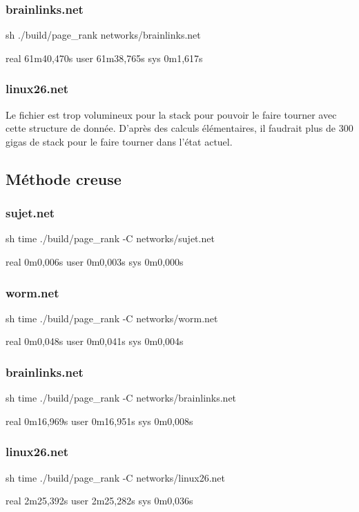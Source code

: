 \documentclass{NewTeX}
\begin{document}
\subsubsection{brainlinks.net}
\begin{code}{sh}
./build/page_rank networks/brainlinks.net

real    61m40,470s
user    61m38,765s
sys     0m1,617s
\end{code}

\subsubsection{linux26.net}
Le fichier est trop volumineux pour la stack pour pouvoir le faire tourner avec cette structure de donnée. D'après des calculs élémentaires, il faudrait plus de 300 gigas de stack pour le faire tourner dans l'état actuel.

\subsection{Méthode creuse}
\subsubsection{sujet.net}
\begin{code}{sh}
time ./build/page_rank -C networks/sujet.net

real    0m0,006s
user    0m0,003s
sys     0m0,000s
\end{code}
\subsubsection{worm.net}
\begin{code}{sh}
time ./build/page_rank -C networks/worm.net

real    0m0,048s
user    0m0,041s
sys     0m0,004s
\end{code}
\subsubsection{brainlinks.net}
\begin{code}{sh}
time ./build/page_rank -C networks/brainlinks.net

real    0m16,969s
user    0m16,951s
sys     0m0,008s
\end{code}
\subsubsection{linux26.net}
\begin{code}{sh}
time ./build/page_rank -C networks/linux26.net

real    2m25,392s
user    2m25,282s
sys     0m0,036s
\end{code}
\end{document}
